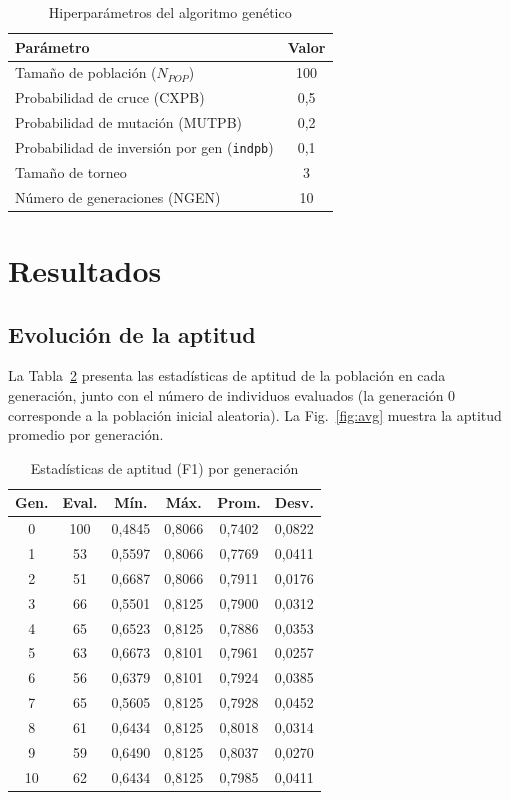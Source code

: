 \documentclass[conference]{IEEEtran}
\begin{document}
\begin{table}[htbp]
\caption{Hiperparámetros del algoritmo genético}
\label{tab:params}
\centering
\begin{tabular}{lc}
\toprule
\textbf{Parámetro} & \textbf{Valor} \\
\midrule
Tamaño de población ($N_{POP}$) & 100 \\
Probabilidad de cruce (CXPB) & 0,5 \\
Probabilidad de mutación (MUTPB) & 0,2 \\
Probabilidad de inversión por gen (\texttt{indpb}) & 0,1 \\
Tamaño de torneo & 3 \\
Número de generaciones (NGEN) & 10 \\
\bottomrule
\end{tabular}
\end{table}

\section{Resultados}\label{sec:resultados}

\subsection{Evolución de la aptitud}
La Tabla~\ref{tab:gens} presenta las estadísticas de aptitud de la población en cada generación, junto con el número de individuos evaluados (la generación 0 corresponde a la población inicial aleatoria). La Fig.~\ref{fig:avg} muestra la aptitud promedio por generación.

\begin{table}[htbp]
\caption{Estadísticas de aptitud (F1) por generación}
\label{tab:gens}
\centering
\begin{tabular}{cccccc}
\toprule
\textbf{Gen.} & \textbf{Eval.} & \textbf{Mín.} & \textbf{Máx.} & \textbf{Prom.} & \textbf{Desv.} \\
\midrule
0  & 100 & 0,4845 & 0,8066 & 0,7402 & 0,0822 \\
1  & 53  & 0,5597 & 0,8066 & 0,7769 & 0,0411 \\
2  & 51  & 0,6687 & 0,8066 & 0,7911 & 0,0176 \\
3  & 66  & 0,5501 & 0,8125 & 0,7900 & 0,0312 \\
4  & 65  & 0,6523 & 0,8125 & 0,7886 & 0,0353 \\
5  & 63  & 0,6673 & 0,8101 & 0,7961 & 0,0257 \\
6  & 56  & 0,6379 & 0,8101 & 0,7924 & 0,0385 \\
7  & 65  & 0,5605 & 0,8125 & 0,7928 & 0,0452 \\
8  & 61  & 0,6434 & 0,8125 & 0,8018 & 0,0314 \\
9  & 59  & 0,6490 & 0,8125 & 0,8037 & 0,0270 \\
10 & 62  & 0,6434 & 0,8125 & 0,7985 & 0,0411 \\
\bottomrule
\end{tabular}
\end{table}
\end{document}
